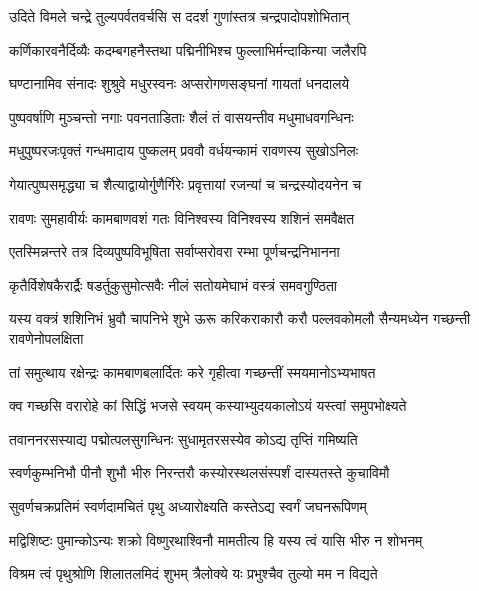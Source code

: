 \twolineshloka
{उदिते विमले चन्द्रे तुल्यपर्वतवर्चसि}
{स ददर्श गुणांस्तत्र चन्द्रपादोपशोभितान्} %

\twolineshloka
{कर्णिकारवनैर्दिव्यैः कदम्बगहनैस्तथा}
{पद्मिनीभिश्च फुल्लाभिर्मन्दाकिन्या जलैरपि} %

\twolineshloka
{घण्टानामिव संनादः शुश्रुवे मधुरस्वनः}
{अप्सरोगणसङ्घनां गायतां धनदालये} %

\twolineshloka
{पुष्पवर्षाणि मुञ्चन्तो नगाः पवनताडिताः}
{शैलं तं वासयन्तीव मधुमाधवगन्धिनः} %

\twolineshloka
{मधुपुष्परजःपृक्तं गन्धमादाय पुष्कलम्}
{प्रववौ वर्धयन्कामं रावणस्य सुखोऽनिलः} %

\twolineshloka
{गेयात्पुष्पसमृद्ध्या च शैत्याद्वायोर्गुणैर्गिरेः}
{प्रवृत्तायां रजन्यां च चन्द्रस्योदयनेन च} %

\twolineshloka
{रावणः सुमहावीर्यः कामबाणवशं गतः}
{विनिश्वस्य विनिश्वस्य शशिनं समवैक्षत} %

\twolineshloka
{एतस्मिन्नन्तरे तत्र दिव्यपुष्पविभूषिता}
{सर्वाप्सरोवरा रम्भा पूर्णचन्द्रनिभानना} %

\twolineshloka
{कृतैर्विशेषकैरार्द्रैः षडर्तुकुसुमोत्सवैः}
{नीलं सतोयमेघाभं वस्त्रं समवगुण्ठिता} %

\threelineshloka
{यस्य वक्त्रं शशिनिभं भ्रुवौ चापनिभे शुभे}
{ऊरू करिकराकारौ करौ पल्लवकोमलौ}
{सैन्यमध्येन गच्छन्ती रावणेनोपलक्षिता} %

\twolineshloka
{तां समुत्थाय रक्षेन्द्रः कामबाणबलार्दितः}
{करे गृहीत्वा गच्छन्तीं स्मयमानोऽभ्यभाषत} %

\twolineshloka
{क्व गच्छसि वरारोहे कां सिद्धिं भजसे स्वयम्}
{कस्याभ्युदयकालोऽयं यस्त्वां समुपभोक्ष्यते} %

\twolineshloka
{तवाननरसस्याद्य पद्मोत्पलसुगन्धिनः}
{सुधामृतरसस्येव कोऽद्य तृप्तिं गमिष्यति} %

\twolineshloka
{स्वर्णकुम्भनिभौ पीनौ शुभौ भीरु निरन्तरौ}
{कस्योरस्थलसंस्पर्शं दास्यतस्ते कुचाविमौ} %

\twolineshloka
{सुवर्णचक्रप्रतिमं स्वर्णदामचितं पृथु}
{अध्यारोक्ष्यति कस्तेऽद्य स्वर्गं जघनरूपिणम्} %

\twolineshloka
{मद्विशिष्टः पुमान्कोऽन्यः शक्रो विष्णुरथाश्विनौ}
{मामतीत्य हि यस्य त्वं यासि भीरु न शोभनम्} %

\twolineshloka
{विश्रम त्वं पृथुश्रोणि शिलातलमिदं शुभम्}
{त्रैलोक्ये यः प्रभुश्चैव तुल्यो मम न विद्यते} %

